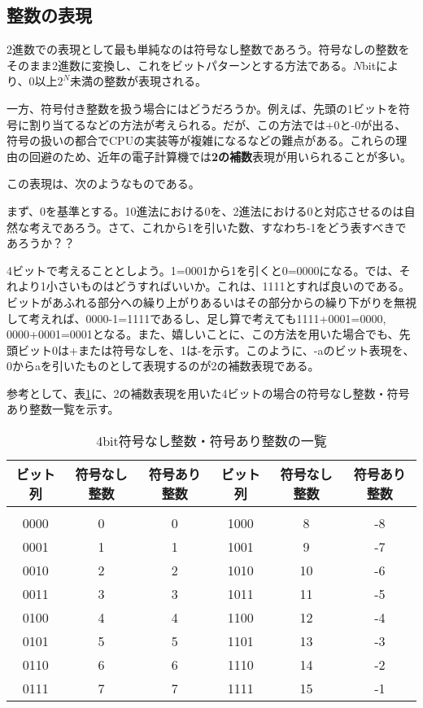 \subsection{整数の表現}
2進数での表現として最も単純なのは符号なし整数であろう。符号なしの整数をそのまま2進数に変換し、これをビットパターンとする方法である。$N$bitにより、0以上$2^{N}$未満の整数が表現される。

一方、符号付き整数を扱う場合にはどうだろうか。例えば、先頭の1ビットを符号に割り当てるなどの方法が考えられる。だが、この方法では+0と-0が出る、符号の扱いの都合でCPUの実装等が複雑になるなどの難点がある。これらの理由の回避のため、近年の電子計算機では\textbf{2の補数}表現が用いられることが多い。

この表現は、次のようなものである。

まず、0を基準とする。10進法における0を、2進法における0と対応させるのは自然な考えであろう。さて、これから1を引いた数、すなわち-1をどう表すべきであろうか？？

4ビットで考えることとしよう。1=0001から1を引くと0=0000になる。では、それより1小さいものはどうすればいいか。これは、1111とすれば良いのである。ビットがあふれる部分への繰り上がりあるいはその部分からの繰り下がりを無視して考えれば、0000-1=1111であるし、足し算で考えても1111+0001=0000, 0000+0001=0001となる。また、嬉しいことに、この方法を用いた場合でも、先頭ビット0は+または符号なしを、1は-を示す。このように、-aのビット表現を、0からaを引いたものとして表現するのが2の補数表現である。

参考として、表\ref{table_sec2}に、2の補数表現を用いた4ビットの場合の符号なし整数・符号あり整数一覧を示す。
\begin{table}[htb]
\centering
\caption{4bit符号なし整数・符号あり整数の一覧}\label{table_sec2}
\begin{tabular}{|c|c|c||c|c|c|}\hline
ビット列&符号なし整数&符号あり整数&ビット列&符号なし整数&符号あり整数\\ \hline
&&&&&\\[-16pt]\hline
0000&0&0&1000&8&-8\\ \hline
0001&1&1&1001&9&-7\\ \hline
0010&2&2&1010&10&-6\\ \hline
0011&3&3&1011&11&-5\\ \hline
0100&4&4&1100&12&-4\\ \hline
0101&5&5&1101&13&-3\\ \hline
0110&6&6&1110&14&-2\\ \hline
0111&7&7&1111&15&-1\\ \hline
\end{tabular}
\end{table}

